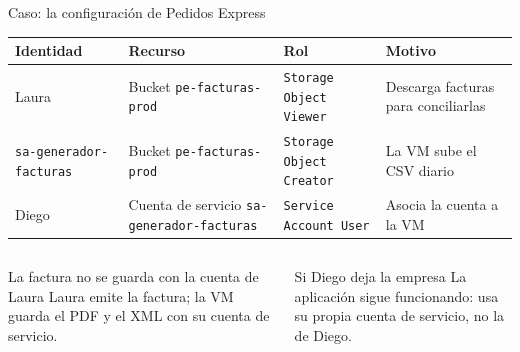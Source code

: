 \documentclass[aspectratio=169,10pt,c]{beamer}
\begin{document}
\begin{frame}{Caso: la configuración de Pedidos Express}
\renewcommand{\arraystretch}{1.3}
\centering\small
\begin{tabular}{@{}>{\raggedright\arraybackslash}p{3.3cm}>{\raggedright\arraybackslash}p{3.4cm}>{\raggedright\arraybackslash}p{2.9cm}>{\raggedright\arraybackslash}p{2.9cm}@{}}
\toprule
\textbf{Identidad} & \textbf{Recurso} & \textbf{Rol} & \textbf{Motivo}\\
\midrule
Laura & Bucket \texttt{pe-facturas-prod} & \texttt{Storage Object Viewer} & Descarga facturas para conciliarlas\\
\texttt{\footnotesize sa-generador-facturas} & Bucket \texttt{pe-facturas-prod} & \texttt{Storage Object Creator} & La VM sube el CSV diario\\
Diego & Cuenta de servicio \texttt{\footnotesize sa-generador-facturas} & \texttt{Service Account User} & Asocia la cuenta a la VM\\
\bottomrule
\end{tabular}
\par\vspace{3mm}
\begin{columns}[T,onlytextwidth]
\begin{block}{La factura no se guarda con la cuenta de Laura}
\small Laura emite la factura; la VM guarda el PDF y el XML con su cuenta de servicio.
\end{block}
\begin{exampleblock}{Si Diego deja la empresa}
\small La aplicación sigue funcionando: usa su propia cuenta de servicio, no la de Diego.
\end{exampleblock}
\end{columns}
\end{frame}
\end{document}
